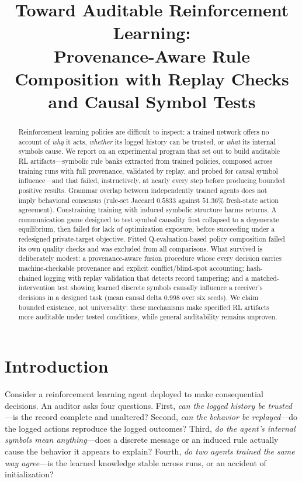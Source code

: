 \documentclass[11pt]{article}
\title{Toward Auditable Reinforcement Learning:\\Provenance-Aware Rule Composition with Replay Checks and Causal Symbol Tests}
\author{}
\date{}
\begin{document}
\maketitle

\begin{abstract}
Reinforcement learning policies are difficult to inspect: a trained network offers no account of \textit{why} it acts, \textit{whether} its logged history can be trusted, or \textit{what} its internal symbols cause. We report on an experimental program that set out to build auditable RL artifacts---symbolic rule banks extracted from trained policies, composed across training runs with full provenance, validated by replay, and probed for causal symbol influence---and that failed, instructively, at nearly every step before producing bounded positive results. Grammar overlap between independently trained agents does not imply behavioral consensus (rule-set Jaccard $0.5833$ against $51.36\%$ fresh-state action agreement). Constraining training with induced symbolic structure harms returns. A communication game designed to test symbol causality first collapsed to a degenerate equilibrium, then failed for lack of optimization exposure, before succeeding under a redesigned private-target objective. Fitted Q-evaluation-based policy composition failed its own quality checks and was excluded from all comparisons. What survived is deliberately modest: a provenance-aware fusion procedure whose every decision carries machine-checkable provenance and explicit conflict/blind-spot accounting; hash-chained logging with replay validation that detects record tampering; and a matched-intervention test showing learned discrete symbols causally influence a receiver's decisions in a designed task (mean causal delta $0.998$ over six seeds). We claim bounded existence, not universality: these mechanisms make specified RL artifacts more auditable under tested conditions, while general auditability remains unproven.
\end{abstract}

\section{Introduction}

Consider a reinforcement learning agent deployed to make consequential decisions. An auditor asks four questions. First, \textit{can the logged history be trusted}---is the record complete and unaltered? Second, \textit{can the behavior be replayed}---do the logged actions reproduce the logged outcomes? Third, \textit{do the agent's internal symbols mean anything}---does a discrete message or an induced rule actually cause the behavior it appears to explain? Fourth, \textit{do two agents trained the same way agree}---is the learned knowledge stable across runs, or an accident of initialization?
\end{document}
